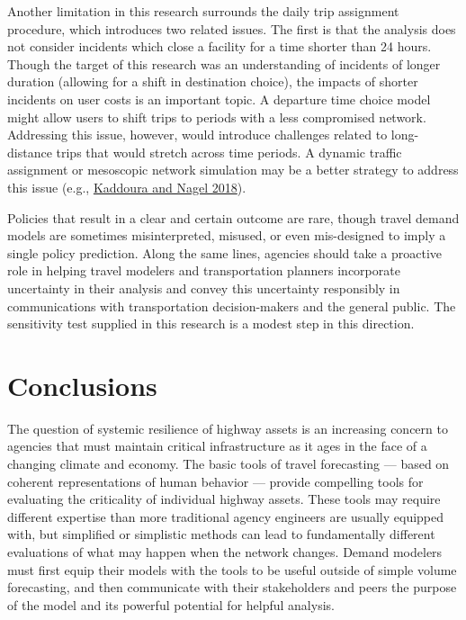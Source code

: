 \documentclass[]{ascelike-new}
\begin{document}
Another limitation in this research surrounds the daily trip assignment
procedure, which introduces two related issues. The first is that the
analysis does not consider incidents which close a facility for a time
shorter than 24 hours. Though the target of this research was an
understanding of incidents of longer duration (allowing for a shift in
destination choice), the impacts of shorter incidents on user costs is
an important topic. A departure time choice model might allow users to
shift trips to periods with a less compromised network. Addressing this
issue, however, would introduce challenges related to long-distance
trips that would stretch across time periods. A dynamic traffic
assignment or mesoscopic network simulation may be a better strategy to
address this issue (e.g., \protect\hyperlink{ref-kaddoura2018}{Kaddoura
and Nagel 2018}).

Policies that result in a clear and certain outcome are rare, though
travel demand models are sometimes misinterpreted, misused, or even
mis-designed to imply a single policy prediction. Along the same lines,
agencies should take a proactive role in helping travel modelers and
transportation planners incorporate uncertainty in their analysis and
convey this uncertainty responsibly in communications with
transportation decision-makers and the general public. The sensitivity
test supplied in this research is a modest step in this direction.


\hypertarget{conclusions}{%
\section{Conclusions}\label{conclusions}}

The question of systemic resilience of highway assets is an increasing
concern to agencies that must maintain critical infrastructure as it
ages in the face of a changing climate and economy. The basic tools of
travel forecasting --- based on coherent representations of human
behavior --- provide compelling tools for evaluating the criticality of
individual highway assets. These tools may require different expertise
than more traditional agency engineers are usually equipped with, but
simplified or simplistic methods can lead to fundamentally different
evaluations of what may happen when the network changes. Demand modelers
must first equip their models with the tools to be useful outside of
simple volume forecasting, and then communicate with their stakeholders
and peers the purpose of the model and its powerful potential for
helpful analysis.
\end{document}
